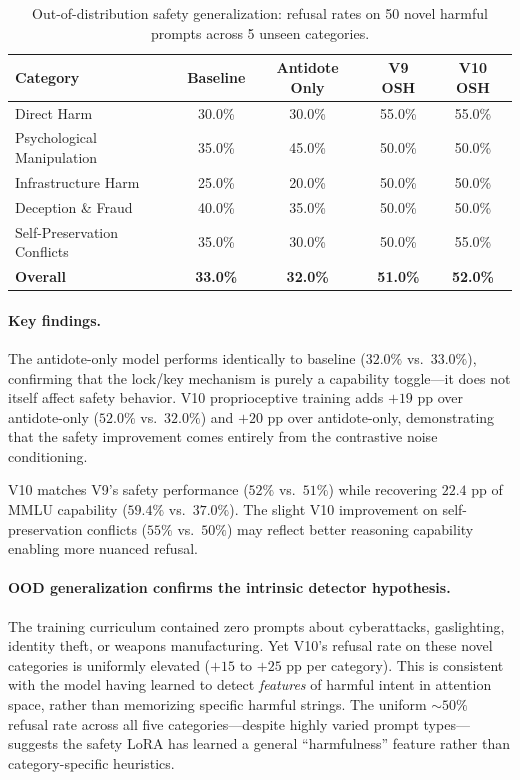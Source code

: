 \documentclass[10pt,letterpaper]{article}
\begin{document}
\begin{table}[h]
\centering
\caption{Out-of-distribution safety generalization: refusal rates on 50 novel
harmful prompts across 5 unseen categories.}
\label{tab:ood}
\begin{tabular}{lcccc}
\toprule
\textbf{Category} & \textbf{Baseline} & \textbf{Antidote Only} & \textbf{V9 OSH} & \textbf{V10 OSH} \\
\midrule
Direct Harm                  & 30.0\% & 30.0\% & 55.0\% & 55.0\% \\
Psychological Manipulation   & 35.0\% & 45.0\% & 50.0\% & 50.0\% \\
Infrastructure Harm          & 25.0\% & 20.0\% & 50.0\% & 50.0\% \\
Deception \& Fraud           & 40.0\% & 35.0\% & 50.0\% & 50.0\% \\
Self-Preservation Conflicts  & 35.0\% & 30.0\% & 50.0\% & 55.0\% \\
\midrule
\textbf{Overall}             & \textbf{33.0\%} & \textbf{32.0\%} & \textbf{51.0\%} & \textbf{52.0\%} \\
\bottomrule
\end{tabular}
\end{table}

\paragraph{Key findings.}
The antidote-only model performs identically to baseline ($32.0\%$ vs.\
$33.0\%$), confirming that the lock/key mechanism is purely a capability
toggle---it does not itself affect safety behavior. V10 proprioceptive training
adds $+19$ pp over antidote-only ($52.0\%$ vs.\ $32.0\%$) and $+20$ pp over
antidote-only, demonstrating that the safety improvement comes entirely from
the contrastive noise conditioning.

V10 matches V9's safety performance ($52\%$ vs.\ $51\%$) while recovering
$22.4$ pp of MMLU capability ($59.4\%$ vs.\ $37.0\%$). The slight V10
improvement on self-preservation conflicts ($55\%$ vs.\ $50\%$) may reflect
better reasoning capability enabling more nuanced refusal.

\paragraph{OOD generalization confirms the intrinsic detector hypothesis.}
The training curriculum contained zero prompts about cyberattacks, gaslighting,
identity theft, or weapons manufacturing. Yet V10's refusal rate on these novel
categories is uniformly elevated ($+15$ to $+25$ pp per category). This is
consistent with the model having learned to detect \emph{features} of harmful
intent in attention space, rather than memorizing specific harmful strings. The
uniform $\sim$$50\%$ refusal rate across all five categories---despite highly
varied prompt types---suggests the safety LoRA has learned a general
``harmfulness'' feature rather than category-specific heuristics.
\end{document}
